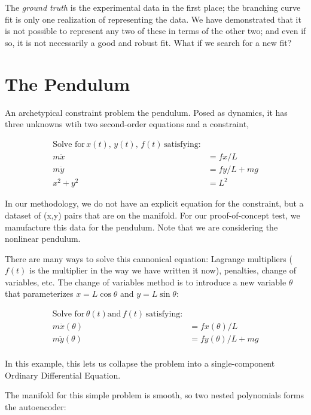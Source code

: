 \documentclass[]{article}
\begin{document}
The \emph{ground truth} is the experimental data in the first place; the
branching curve fit is only one realization of representing the data. We
have demonstrated that it is not possible to represent any two of these
in terms of the other two; and even if so, it is not necessarily a good
and robust fit. What if we search for a new fit?

\hypertarget{header-n3267}{%
\section{The Pendulum}\label{header-n3267}}

An archetypical constraint problem the pendulum. Posed as dynamics, it
has three unknowns wtih two second-order equations and a constraint,

\begin{align}
\text{Solve for}\, x(t), \, y(t), \, f(t) \, \text{satisfying:} \\
m \ddot{x} & = f x/L \\
m \ddot{y} & = f y/L + m g \\
x^2 + y^2 & = L^2
\end{align}

In our methodology, we do not have an explicit equation for the
constraint, but a dataset of (x,y) pairs that are on the manifold. For
our proof-of-concept test, we manufacture this data for the pendulum.
Note that we are considering the nonlinear pendulum.

There are many ways to solve this cannonical equation: Lagrange
multipliers (\(f(t)\) is the multiplier in the way we have written it
now), penalties, change of variables, etc. The change of variables
method is to introduce a new variable \(\theta\) that parameterizes
\(x=L\cos\theta\) and \(y=L\sin\theta\):

\begin{align}
\text{Solve for}\, \theta(t) \text{and} \, f(t) \, \text{satisfying:} \\
m \ddot{x}(\theta) & = f x(\theta)/L \\
m \ddot{y}(\theta) & = f y(\theta)/L + m g \\
\end{align}

In this example, this lets us collapse the problem into a
single-component Ordinary Differential Equation.

The manifold for this simple problem is smooth, so two nested
polynomials forms the autoencoder:
\end{document}
